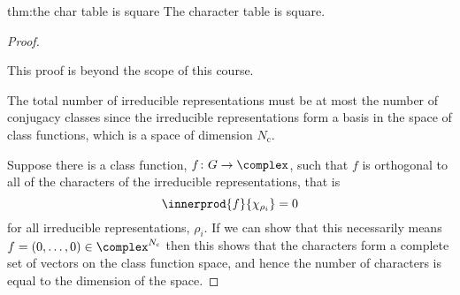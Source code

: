 \begin{thm}{}{thm:the char table is square}
    The character table is square.
    
    \begin{proof}
        \begin{rmk}
            This proof is beyond the scope of this course.
        \end{rmk}
        \vspace{1ex}
        The total number of irreducible representations must be at most the
        number of conjugacy classes since the irreducible representations form a basis
        in the space of class functions, which is a space of dimension 
        \(N_\mathrm{c}\).
        
        Suppose there is a class function, \(f \colon G \to \complex\), such
        that \(f\) is orthogonal to all of the characters of the irreducible
        representations, that is
        \begin{equation}
            \innerprod{f}{\chi_{\rho_i}} = 0
        \end{equation}
        for all irreducible representations, \(\rho_i\).
        If we can show that this necessarily means \(f = (0, \dotsc, 0) \in
        \complex^{N_{\mathrm{c}}}\) then this shows that the characters form a complete
        set of vectors on the class function space, and hence the number of characters
        is equal to the dimension of the space.
        

\end{proof}
\end{thm}
